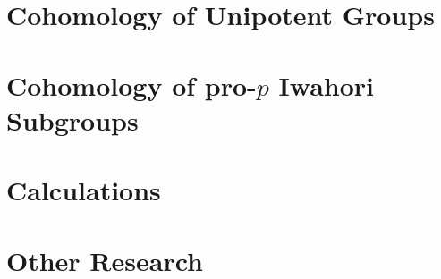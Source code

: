 \documentclass[letterpaper,oneside,english,11pt,openany]{memoir}
\begin{document}
\clearpage

\mainmatter

\renewcommand*{\chaptitlefont}{\Huge\bfseries}



\chapter{Cohomology of Unipotent Groups}%
\label{cha:cohunigps}



\chapter{Cohomology of pro-\texorpdfstring{$p$}{p} Iwahori Subgroups}%
\label{cha:cohiwagps}



\clearpage

\appendix

\chapter{Calculations}



\chapter{Other Research}%
\label{cha:robstat}



\clearpage

\backmatter

\SingleSpacing

\printbibliography

\clearpage

\printindex
\end{document}
